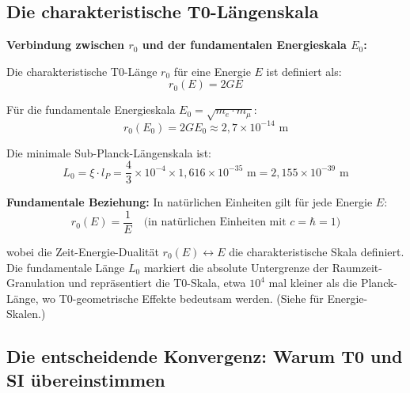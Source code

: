 	\subsection{Die charakteristische T0-Längenskala}
	
	\begin{insight}
		\textbf{Verbindung zwischen $r_0$ und der fundamentalen Energieskala $E_0$:}
		
		Die charakteristische T0-Länge $r_0$ für eine Energie $E$ ist definiert als:
		\begin{equation}
			r_0(E) = 2GE
		\end{equation}
		
		Für die fundamentale Energieskala $E_0 = \sqrt{m_e \cdot m_\mu}$:
		\begin{equation}
			r_0(E_0) = 2GE_0 \approx 2{,}7 \times 10^{-14} \text{ m}
		\end{equation}
		
		Die minimale Sub-Planck-Längenskala ist:
		\begin{equation}
			\boxed{L_0 = \xi \cdot l_P = \frac{4}{3} \times 10^{-4} \times 1{,}616 \times 10^{-35} \text{ m} = 2{,}155 \times 10^{-39} \text{ m}}
		\end{equation}
		
		\textbf{Fundamentale Beziehung:} In natürlichen Einheiten gilt für jede Energie $E$:
		\begin{equation}
			r_0(E) = \frac{1}{E} \quad \text{(in natürlichen Einheiten mit } c = \hbar = 1\text{)}
		\end{equation}
		
		wobei die Zeit-Energie-Dualität $r_0(E) \leftrightarrow E$ die charakteristische Skala definiert. Die fundamentale Länge $L_0$ markiert die absolute Untergrenze der Raumzeit-Granulation und repräsentiert die T0-Skala, etwa $10^4$ mal kleiner als die Planck-Länge, wo T0-geometrische Effekte bedeutsam werden. (Siehe \cite{T0_Energie_De} für Energie-Skalen.)
	\end{insight}
	
	\subsection{Die entscheidende Konvergenz: Warum T0 und SI übereinstimmen}
	
